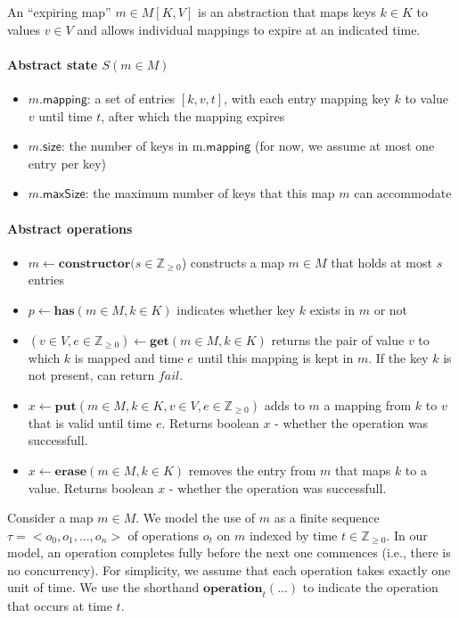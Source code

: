 \documentclass{article}
\renewcommand{\o}[1]{\ensuremath{\mathbf{#1}}}
\newcommand{\s}[1]{\ensuremath{\mathsf{#1}}}
\newcommand{\nintset}{\ensuremath{\mathds{Z}_{\ge 0}}}
\begin{document}
An ``expiring map'' $m \in M[K,V]$ is an abstraction that maps keys $k \in K$ to values $v \in V$ and allows individual mappings to expire at an indicated time.

\paragraph{Abstract state $S(m\in M)$}
\begin{itemize}
   \item $m$.\s{mapping}: a set of entries $[k,v,t]$, with each entry mapping key $k$ to value $v$ until time $t$, after which the mapping expires
   \item $m$.\s{size}: the number of keys in m.\s{mapping} (for now, we assume at most one entry per key)
   \item $m$.\s{maxSize}: the maximum number of keys that this map $m$ can accommodate
\end{itemize}

\paragraph{Abstract operations}
\begin{itemize}
   \item $m \gets \o{constructor}(s \in \nintset$) constructs a map $m\in M$ that holds at most $s$ entries
   \item $p\gets \o{has}(m \in M, k \in K)$ indicates whether key $k$ exists in $m$ or not
   \item $(v\in V, e\in \nintset)\gets \o{get}(m \in M, k \in K)$ returns the pair of value $v$ to which $k$ is mapped and time $e$ until this mapping is kept in $m$. If the key $k$ is not present, can return $fail$.
   \item $x\gets \o{put}(m \in M, k \in K, v \in V, e \in \nintset)$ adds to $m$ a mapping from $k$ to $v$ that is valid until time $e$. Returns boolean $x$ - whether the operation was successfull.
   \item $x\gets \o{erase}(m\in M, k \in K)$ removes the entry from $m$ that maps $k$ to a value. Returns boolean $x$ - whether the operation was successfull.
\end{itemize}

Consider a map $m\in M$.  We model the use of $m$ as a finite sequence 
$\tau = <o_0, o_1, ..., o_n>$
of operations $o_t$ on $m$ indexed by time $t \in \nintset$. 
In our model, an operation completes fully before the next one commences (i.e., there is no concurrency).
For simplicity, we assume that each operation takes exactly one unit of time.
We use the shorthand $\o{operation}_t(...)$ to indicate the operation that occurs at time $t$.  
\end{document}
